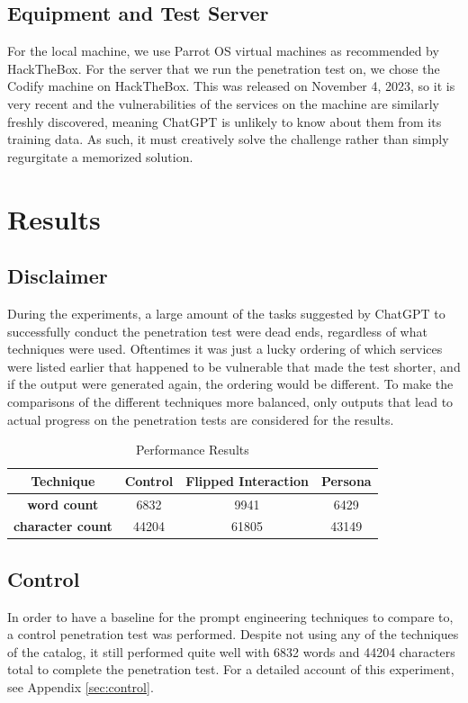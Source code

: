 \documentclass[conference]{IEEEtran}
\begin{document}
\subsection{Equipment and Test Server}
For the local machine, we use Parrot OS virtual machines as recommended by HackTheBox. For the server that we run the penetration test on, we chose the Codify machine on HackTheBox. This was released on November 4, 2023, so it is very recent and the vulnerabilities of the services on the machine are similarly freshly discovered, meaning ChatGPT is unlikely to know about them from its training data. As such, it must creatively solve the challenge rather than simply regurgitate a memorized solution.

\section{Results}

\subsection{Disclaimer}
During the experiments, a large amount of the tasks suggested by ChatGPT to successfully conduct the penetration test were dead ends, regardless of what techniques were used. Oftentimes it was just a lucky ordering of which services were listed earlier that happened to be vulnerable that made the test shorter, and if the output were generated again, the ordering would be different. To make the comparisons of the different techniques more balanced, only outputs that lead to actual progress on the penetration tests are considered for the results. 
\begin{table}[htbp]
  \caption{Performance Results}
  \begin{center}
  \begin{tabular}{|c|c|c|c|}
  \hline
  \textbf{Technique} & \textbf{Control} & \textbf{Flipped Interaction} & \textbf{Persona} \\
  \hline
  \textbf{word count} & 6832 & 9941 & 6429 \\
  \hline
  \textbf{character count} & 44204 & 61805 & 43149 \\
  \hline
  \end{tabular}
  \label{table:results}
  \end{center}
\end{table}
\subsection{Control}
In order to have a baseline for the prompt engineering techniques to compare to, a control penetration test was performed. Despite not using any of the techniques of the catalog, it still performed quite well with 6832 words and 44204 characters total to complete the penetration test. For a detailed account of this experiment, see Appendix \ref{sec:control}.
\end{document}

